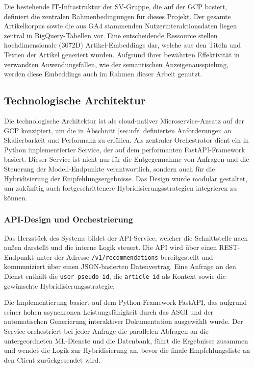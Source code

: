 Die bestehende IT-Infrastruktur der SV-Gruppe, die auf der \ac{GCP} basiert, definiert die zentralen Rahmenbedingungen für dieses Projekt. 
Der gesamte Artikelkorpus sowie die aus \ac{GA4} stammenden Nutzerinteraktionsdaten liegen zentral in BigQuery-Tabellen vor. 
Eine entscheidende Ressource stellen hochdimensionale (3072D) Artikel-Embeddings dar, 
welche aus den Titeln und Texten der Artikel generiert wurden. Aufgrund ihrer bewährten Effektivität in verwandten Anwendungsfällen, 
wie der semantischen Anzeigenausspielung, werden diese Embeddings auch im Rahmen dieser Arbeit genutzt.

\subsection{Technologische Architektur}

Die technologische Architektur ist als cloud-nativer Microservice-Ansatz auf der \ac{GCP} konzipiert,
um die in Abschnitt \ref{sec:nfr} definierten Anforderungen an Skalierbarkeit und Performanz zu erfüllen. 
Als zentraler Orchestrator dient ein in Python implementierter Service, der auf dem performanten FastAPI-Framework basiert. 
Dieser Service ist nicht nur für die Entgegennahme von Anfragen und die Steuerung der Modell-Endpunkte verantwortlich, 
sondern auch für die Hybridisierung der Empfehlungsergebnisse. Das Design wurde modular gestaltet, 
um zukünftig auch fortgeschrittenere Hybridisierungsstrategien integrieren zu können.

\subsubsection{API-Design und Orchestrierung}
\label{sec:api_design}

Das Herzstück des Systems bildet der API-Service, welcher die Schnittstelle nach außen darstellt und die interne Logik steuert. 
Die API wird über einen REST-Endpunkt unter der Adresse \texttt{/v1/recommendations} bereitgestellt und kommuniziert über einen 
JSON-basierten Datenvertrag. Eine Anfrage an den Dienst enthält die \texttt{user\_pseudo\_id}, die \texttt{article\_id} 
als Kontext sowie die gewünschte Hybridisierungsstrategie. 

Die Implementierung basiert auf dem Python-Framework FastAPI, das aufgrund seiner hohen asynchronen Leistungsfähigkeit durch das \ac{ASGI} und 
der automatischen Generierung interaktiver Dokumentation ausgewählt wurde. Der Service orchestriert bei 
jeder Anfrage die parallelen Abfragen an die untergeordneten ML-Dienste und die Datenbank, führt die Ergebnisse zusammen 
und wendet die Logik zur Hybridisierung an, bevor die finale Empfehlungsliste an den Client zurückgesendet wird.

